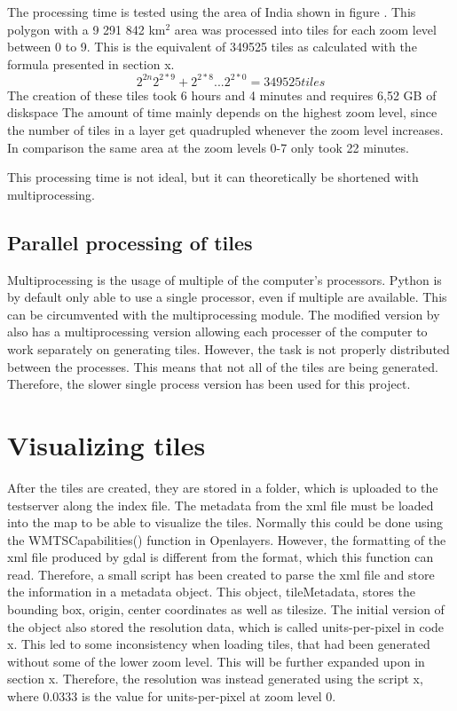 The processing time is tested using the area of India shown in figure \citep{ProcessingTime}. This polygon with a 9 291 842 km$^2$ area was processed into tiles for each zoom level between 0 to 9. This is the equivalent of 349525 tiles as calculated with the formula presented in section x. 
\begin{equation}
2^{2n}
2^{2*9}+2^{2*8} .. . 2^{2*0} = 349525 tiles
\end{equation}
The creation of these tiles took 6 hours and 4 minutes and requires 6,52 GB of diskspace The amount of time mainly depends on the highest zoom level, since the number of tiles in a layer get quadrupled whenever the zoom level increases. In comparison the same area at the zoom levels 0-7 only took 22 minutes.

This processing time is not ideal, but it can theoretically be shortened with multiprocessing.
\subsection{Parallel processing of tiles}
Multiprocessing is the usage of multiple of the computer’s processors. Python is by default only able to use a single processor, even if multiple are available.  This can be circumvented with the multiprocessing module.
\citep{Multiprocessing}
The modified version by \citet{gdalLeaflet} also has a multiprocessing version allowing each processer of the computer to work separately on generating tiles. However, the task is not properly distributed between the processes. This means that not all of the tiles are being generated. 
\citep{NoMulti}
Therefore, the slower single process version has been used for this project.


\section{Visualizing tiles}
After the tiles are created, they are stored in a folder, which is uploaded to the testserver along the index file. 
The metadata from the xml file must be loaded into the map to be able to visualize the tiles. Normally this could be done using the WMTSCapabilities() function in Openlayers.
\citep{WmtsOl}
However, the formatting of the xml file produced by gdal is different from the format, which this function can read. Therefore, a small script has been created to parse the xml file and store the information in a metadata object. This object, tileMetadata, stores the bounding box, origin, center coordinates as well as tilesize. The initial version of the object also stored the resolution data, which is called units-per-pixel in code x. This led to some inconsistency when loading tiles, that had been generated without some of the lower zoom level. This will be further expanded upon in section x. Therefore, the resolution was instead generated using the script x, where 0.0333 is the value for units-per-pixel at zoom level 0. 

